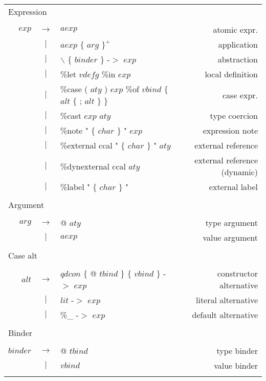 \begin{footnotesize}
\begin{longtable}{ r c l r }
\multicolumn{4}{l}{Expression}			 \\
\\[0.01in]
$exp$		& $ \rightarrow $	& $aexp$										& atomic expr.		\\
		& $ | $			& $aexp$ $\{$ $arg$ $\}^{+}$ 								& application		\\
		& $ | $			& $\backslash$ $\{$ $binder$ $\}$ -$>$ $exp$						& abstraction		\\
		& $ | $			& \%let	$vdefg$ \%in $exp$								& local definition	\\
		& $ | $			& \%case ( $aty$ ) $exp$ \%of $vbind$ $\{$ $alt$ $\{$ ; $alt$ $\}$ $\}$			& case expr.		\\
		& $ | $			& \%cast $exp$ $aty$									& type coercion		\\
		& $ | $			& \%note "  $\{$ $char$ $\}$ " $exp$							& expression note	\\
		& $ | $			& \%external ccal " $\{$ $char$ $\}$ " $aty$						& external reference	\\
		& $ | $			& \%dynexternal ccal $aty$								& external reference (dynamic)	\\
		& $ | $			& \%label " $\{$ $char$ $\}$ "								& external label	\\
\\[0.01in]

\multicolumn{4}{l}{Argument}			 \\
\\[0.01in]
$arg$		& $ \rightarrow $	& @ $aty$										& type argument		\\
		& $ | $			& $aexp$										& value argument	\\
\\[0.01in]

\multicolumn{4}{l}{Case alt}			 \\
\\[0.01in]
$alt$		& $ \rightarrow $	& $qdcon$ $\{$ @ $tbind$ $\}$ $\{$ $vbind$ $\}$ -$>$ $exp$				& constructor alternative \\
		& $ | $			& $lit$ -$>$ $exp$									& literal alternative 	\\
		& $ | $			& \%\_ -$>$ $exp$									& default alternative	\\
\\[0.01in]

\multicolumn{4}{l}{Binder}			 \\
\\[0.01in]
$binder$	& $ \rightarrow $	& @ $tbind$										& type binder		\\
		& $ | $			& $vbind$										& value binder		\\
\\[0.01in]


\end{longtable}
\end{footnotesize}
